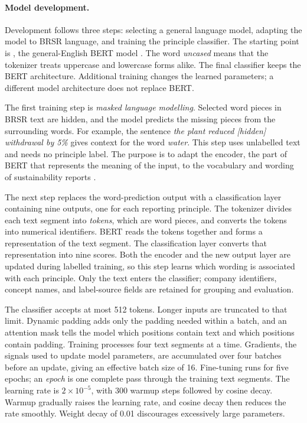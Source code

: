 \paragraph{Model development.} Development follows three steps: selecting a general language model, adapting the model to BRSR language, and training the principle classifier. The starting point is , the general-English BERT model \cite{devlin2019}. The word \emph{uncased} means that the tokenizer treats uppercase and lowercase forms alike. The final classifier keeps the BERT architecture. Additional training changes the learned parameters; a different model architecture does not replace BERT.

The first training step is \emph{masked language modelling}. Selected word pieces in BRSR text are hidden, and the model predicts the missing pieces from the surrounding words. For example, the sentence \emph{the plant reduced [hidden] withdrawal by 5\%} gives context for the word \emph{water}. This step uses unlabelled text and needs no principle label. The purpose is to adapt the encoder, the part of BERT that represents the meaning of the input, to the vocabulary and wording of sustainability reports \cite{gururangan2020}.

The next step replaces the word-prediction output with a classification layer containing nine outputs, one for each reporting principle. The tokenizer divides each text segment into \emph{tokens}, which are word pieces, and converts the tokens into numerical identifiers. BERT reads the tokens together and forms a representation of the text segment. The classification layer converts that representation into nine scores. Both the encoder and the new output layer are updated during labelled training, so this step learns which wording is associated with each principle. Only the text enters the classifier; company identifiers, concept names, and label-source fields are retained for grouping and evaluation.

The classifier accepts at most 512 tokens. Longer inputs are truncated to that limit. Dynamic padding adds only the padding needed within a batch, and an attention mask tells the model which positions contain text and which positions contain padding. Training processes four text segments at a time. Gradients, the signals used to update model parameters, are accumulated over four batches before an update, giving an effective batch size of 16. Fine-tuning runs for five epochs; an \emph{epoch} is one complete pass through the training text segments. The learning rate is $2\times10^{-5}$, with 300 warmup steps followed by cosine decay. Warmup gradually raises the learning rate, and cosine decay then reduces the rate smoothly. Weight decay of 0.01 discourages excessively large parameters.

